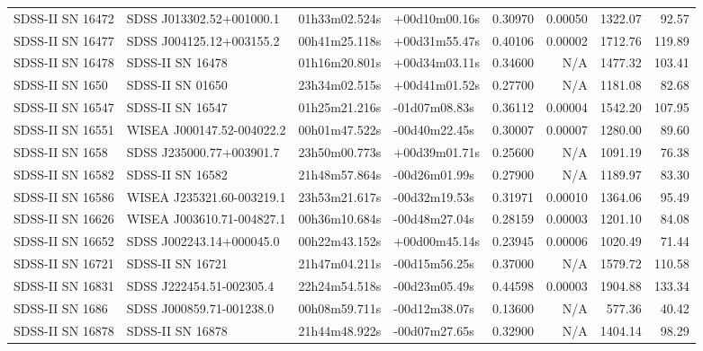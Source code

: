 \begin{longtable}{llllrrrr}
SDSS-II SN 16472 &        SDSS J013302.52+001000.1 &   01h33m02.524s &   +00d10m00.16s &  0.30970 &  0.00050 &  1322.07 &       92.57 \\
SDSS-II SN 16477 &        SDSS J004125.12+003155.2 &   00h41m25.118s &   +00d31m55.47s &  0.40106 &  0.00002 &  1712.76 &      119.89 \\
SDSS-II SN 16478 &                SDSS-II SN 16478 &   01h16m20.801s &   +00d34m03.11s &  0.34600 &      N/A &  1477.32 &      103.41 \\
SDSS-II SN 1650  &                SDSS-II SN 01650 &   23h34m02.515s &   +00d41m01.52s &  0.27700 &      N/A &  1181.08 &       82.68 \\
SDSS-II SN 16547 &                SDSS-II SN 16547 &   01h25m21.216s &   -01d07m08.83s &  0.36112 &  0.00004 &  1542.20 &      107.95 \\
SDSS-II SN 16551 &       WISEA J000147.52-004022.2 &   00h01m47.522s &   -00d40m22.45s &  0.30007 &  0.00007 &  1280.00 &       89.60 \\
SDSS-II SN 1658  &        SDSS J235000.77+003901.7 &   23h50m00.773s &   +00d39m01.71s &  0.25600 &      N/A &  1091.19 &       76.38 \\
SDSS-II SN 16582 &                SDSS-II SN 16582 &   21h48m57.864s &   -00d26m01.99s &  0.27900 &      N/A &  1189.97 &       83.30 \\
SDSS-II SN 16586 &       WISEA J235321.60-003219.1 &   23h53m21.617s &   -00d32m19.53s &  0.31971 &  0.00010 &  1364.06 &       95.49 \\
SDSS-II SN 16626 &       WISEA J003610.71-004827.1 &   00h36m10.684s &   -00d48m27.04s &  0.28159 &  0.00003 &  1201.10 &       84.08 \\
SDSS-II SN 16652 &        SDSS J002243.14+000045.0 &   00h22m43.152s &   +00d00m45.14s &  0.23945 &  0.00006 &  1020.49 &       71.44 \\
SDSS-II SN 16721 &                SDSS-II SN 16721 &   21h47m04.211s &   -00d15m56.25s &  0.37000 &      N/A &  1579.72 &      110.58 \\
SDSS-II SN 16831 &        SDSS J222454.51-002305.4 &   22h24m54.518s &   -00d23m05.49s &  0.44598 &  0.00003 &  1904.88 &      133.34 \\
SDSS-II SN 1686  &        SDSS J000859.71-001238.0 &   00h08m59.711s &   -00d12m38.07s &  0.13600 &      N/A &   577.36 &       40.42 \\
SDSS-II SN 16878 &                SDSS-II SN 16878 &   21h44m48.922s &   -00d07m27.65s &  0.32900 &      N/A &  1404.14 &       98.29 \\

\end{longtable}
